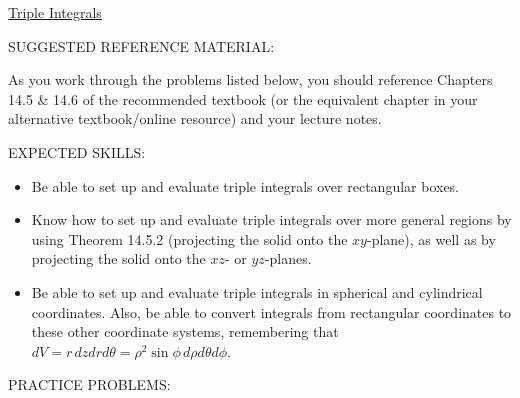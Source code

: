 \documentclass[12pt]{article}
\begin{document}
\begin{center}
\underline{\LARGE{Triple Integrals}}
\end{center}

\noindent SUGGESTED REFERENCE MATERIAL:

\bigskip

\noindent As you work through the problems listed below, you should reference Chapters 14.5 \& 14.6 of the recommended textbook (or the equivalent chapter in your alternative textbook/online resource) and your lecture notes.

\bigskip

\noindent EXPECTED SKILLS:

\begin{itemize}

\item Be able to set up and evaluate triple integrals over rectangular boxes.

\item Know how to set up and evaluate triple integrals over more general regions by using Theorem 14.5.2 (projecting the solid onto the $xy$-plane), as well as by projecting the solid onto the $xz$- or $yz$-planes.

\item Be able to set up and evaluate triple integrals in spherical and cylindrical coordinates. Also, be able to convert integrals from rectangular coordinates to these other coordinate systems, remembering that $dV = r\,dzdrd\theta=\rho^2\sin\phi \,d\rho d\theta d\phi$.

\end{itemize}

\noindent PRACTICE PROBLEMS:

\medskip
\end{document}

